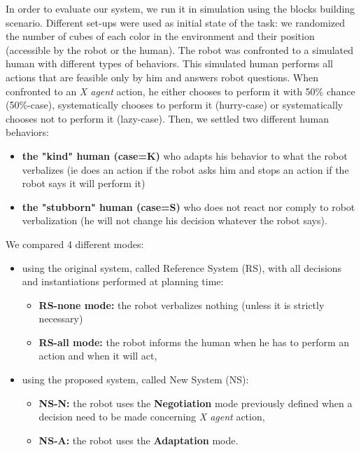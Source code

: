 \documentclass[english,a4paper,11pt,twoside]{StyleThese}
\begin{document}
In order to evaluate our system, we run it in simulation using the blocks building scenario. Different set-ups were used as initial state of the task: we randomized the number of cubes of each color in the environment and their position (accessible by the robot or the human). The robot was confronted to a simulated human with different types of behaviors. This simulated human performs all actions that are feasible only by him and answers robot questions. When confronted to an \textit{X agent} action, he either chooses to perform it with 50\% chance (50\%-case), systematically chooses to perform it (hurry-case) or systematically chooses not to perform it (lazy-case). Then, we settled two different human behaviors:
\begin{itemize}
\item \textbf{the "kind" human (case=K)} who adapts his behavior to what the robot verbalizes (ie does an action if the robot asks him and stops an action if the robot says it will perform it)
\item \textbf{the "stubborn" human (case=S)} who does not react nor comply to robot verbalization (he will not change his decision whatever the robot says).
\end{itemize}

We compared 4 different modes:
\begin{itemize}
\item using the original system, called Reference System (RS), with all decisions and instantiations performed at planning time:
\begin{itemize}
\item \textbf{RS-none mode:} the robot verbalizes nothing (unless it is strictly necessary)
\item \textbf{RS-all mode:} the robot informs the human when he has to perform an action and when it will act,
\end{itemize}
\item using the proposed system, called New System (NS): 
\begin{itemize}
\item \textbf{NS-N:} the robot uses the \textbf{Negotiation} mode previously defined when a decision need to be made concerning \textit{X agent} action,
\item \textbf{NS-A:} the robot uses the \textbf{Adaptation} mode.
\end{itemize}
\end{itemize}
\end{document}
